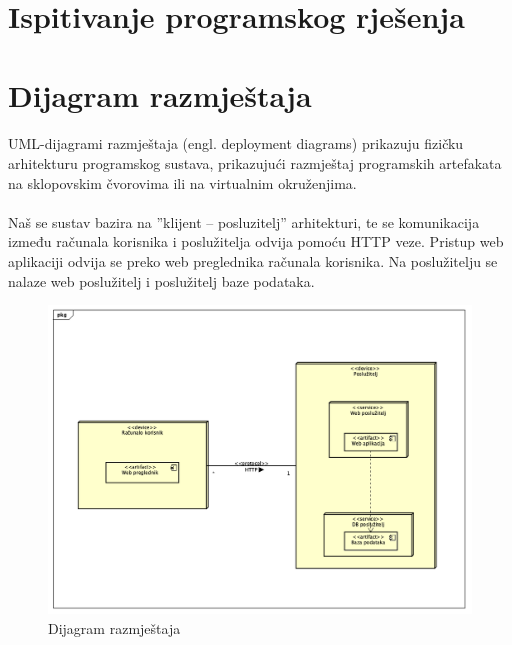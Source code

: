 \section{Ispitivanje programskog rješenja}

\section{Dijagram razmještaja}

\paragraph{}{
UML-dijagrami razmještaja (engl. deployment diagrams) prikazuju fizičku arhitekturu programskog sustava, prikazujući razmještaj programskih artefakata na sklopovskim čvorovima ili na virtualnim okruženjima.
}

\paragraph{}{
Naš se sustav bazira na ”klijent – posluzitelj” arhitekturi, te se komunikacija između računala korisnika i poslužitelja odvija pomoću HTTP veze. Pristup web aplikaciji odvija se preko web preglednika računala korisnika. Na poslužitelju se nalaze web poslužitelj i poslužitelj baze podataka.
}

\begin{figure}[!htb]
	\centering
	\includegraphics[width=1\linewidth]{dijagrami/DijagramRazmjestaja.png}
	\caption{Dijagram razmještaja}
	\label{fig:modelsdiagram}
\end{figure}

